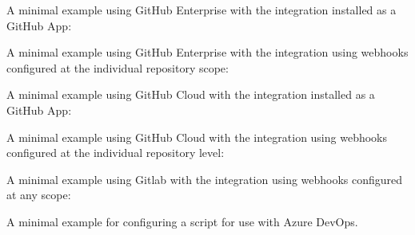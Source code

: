 \pagebreak
A minimal example using GitHub Enterprise with the \cxoneflow integration installed
as a GitHub App:

  
  
\pagebreak
A minimal example using GitHub Enterprise with the \cxoneflow integration using
webhooks configured at the individual repository scope:





\pagebreak
A minimal example using GitHub Cloud with the \cxoneflow integration installed
as a GitHub App:


  
  
\pagebreak
A minimal example using GitHub Cloud with the \cxoneflow integration using
webhooks configured at the individual repository level:


\pagebreak
A minimal example using Gitlab with the \cxoneflow integration using
webhooks configured at any scope:



\pagebreak
A minimal example for configuring a  script
for use with Azure DevOps.

